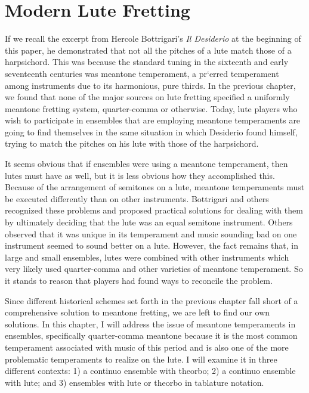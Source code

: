 \chapter{Modern Lute Fretting}

If we recall the excerpt from Hercole Bottrigari's \textit{Il Desiderio} at the beginning of this paper, he demonstrated
that not all the pitches of a lute match those of a harpsichord. This was because the standard tuning in the sixteenth
and early seventeenth centuries was meantone temperament, a pr`erred temperament among instruments due to its
harmonious, pure thirds. In the previous chapter, we found that none of the major sources on lute fretting specified a
uniformly meantone fretting system, quarter-comma or otherwise. Today, lute players who wish to participate in ensembles
that are employing meantone temperaments are going to find themselves in the same situation in which Desiderio found
himself, trying to match the pitches on his lute with those of the harpsichord.

It seems obvious that if ensembles were using a meantone temperament, then lutes must have as well, but it is less
obvious how they accomplished this. Because of the arrangement of semitones on a lute, meantone temperaments must be
executed differently than on other instruments. Bottrigari and others recognized these problems and proposed practical
solutions for dealing with them by ultimately deciding that the lute was an equal semitone instrument. Others observed
that it was unique in its temperament and music sounding bad on one instrument seemed to sound better on a
lute.\autocite[45]{ML:1} However, the fact remains that, in large and small ensembles, lutes were combined with other
instruments which very likely used quarter-comma and other varieties of meantone temperament. So it stands to reason
that players had found ways to reconcile the problem.

Since different historical schemes set forth in the previous chapter fall short of a comprehensive solution to meantone
fretting, we are left to find our own solutions. In this chapter, I will address the issue of meantone temperaments in
ensembles, specifically quarter-comma meantone because it is the most common temperament associated with music of this
period and is also one of the more problematic temperaments to realize on the lute. I will examine it in three different
contexts: 1) a continuo ensemble with theorbo; 2) a continuo ensemble with lute; and 3) ensembles with lute or theorbo
in tablature notation.

